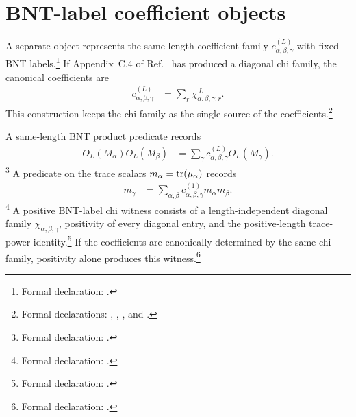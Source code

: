 \documentclass{article}
\begin{document}
\section{BNT-label coefficient objects}

A separate object represents the same-length coefficient family
$c^{(L)}_{\alpha,\beta,\gamma}$ with fixed BNT labels.\footnote{Formal
declaration: .} If Appendix~C.4
of Ref.~\cite{Cirac2016MPDO_arXiv} has produced a diagonal chi family, the
canonical coefficients are
\begin{align}
    c^{(L)}_{\alpha,\beta,\gamma}
        &= \sum_r\chi_{\alpha,\beta,\gamma,r}^{\,L}.
\label{eq:cpgsv17_blocked_chi_uniformity_canonical_chi_coefficients}
\end{align}
This construction keeps the chi family as the single source of the
coefficients.\footnote{Formal declarations:
,
,
,
and
.}

A same-length BNT product predicate records
\begin{align}
    O_L(M_\alpha)O_L(M_\beta)
        &= \sum_\gamma
            c^{(L)}_{\alpha,\beta,\gamma}O_L(M_\gamma).
\label{eq:cpgsv17_blocked_chi_uniformity_formal_same_length_product}
\end{align}
\footnote{Formal declaration:
.}
A predicate on the trace scalars $m_\alpha=\operatorname{tr}(\mu_\alpha)$ records
\begin{align}
    m_\gamma
        &= \sum_{\alpha,\beta}
            c^{(1)}_{\alpha,\beta,\gamma}m_\alpha m_\beta.
\label{eq:cpgsv17_blocked_chi_uniformity_formal_idempotent_condition}
\end{align}
\footnote{Formal declaration:
.}
A positive BNT-label chi witness consists of a length-independent diagonal
family $\chi_{\alpha,\beta,\gamma}$, positivity of every diagonal entry, and
the positive-length trace-power identity.\footnote{Formal declaration:
.} If the coefficients
are canonically determined by the same chi family, positivity alone produces
this witness.\footnote{Formal declaration:
.}
\end{document}
